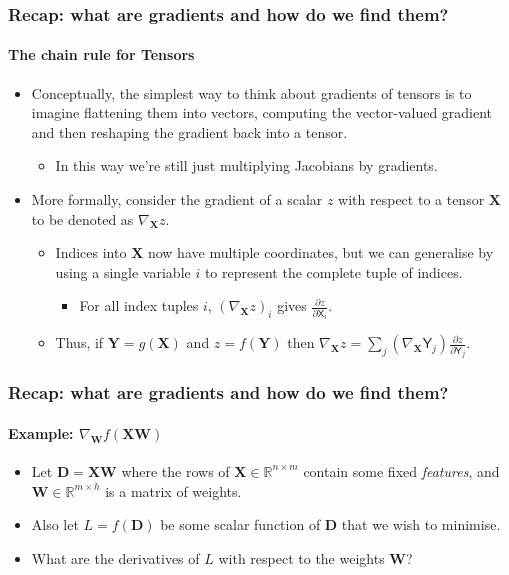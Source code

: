 \documentclass[\beamerclass]{beamer}
\begin{document}
\begin{frame}
\frametitle{Recap: what are gradients and how do we find them?}
\framesubtitle{The chain rule for Tensors}
\begin{itemize}
	\item<+-> Conceptually, the simplest way to think about gradients of tensors is to imagine flattening them into vectors, computing the vector-valued gradient and then reshaping the gradient back into a tensor. 
	\begin{itemize}
		\item<+-> In this way we're still just multiplying Jacobians by gradients. 
	\end{itemize}
	\item<+-> More formally, consider the gradient of a scalar $z$ with respect to a tensor $\mathbf{X}$ to be denoted as $\nabla_{\mathbf{X}}z$. 
	\begin{itemize}
		\item<+-> Indices into $\mathbf{X}$ now have multiple coordinates, but we can generalise by using a single variable $i$ to represent the complete tuple of indices. 
		\begin{itemize}
			\item<+-> For all index tuples $i$, $(\nabla_{\mathbf{X}}z)_i$ gives $\frac{\partial z}{\partial \mathsf{X}_i}$.
		\end{itemize}
		\item<+-> Thus, if $\mathbf{Y} = g(\mathbf{X})$ and $z = f(\mathbf{Y})$ then $\nabla_{\mathbf{X}}z = \sum_j (\nabla_{\mathbf{X}}\mathsf{Y}_j)\frac{\partial z}{\partial \mathsf{Y}_j}$.
	\end{itemize}
\end{itemize}


\end{frame}

\begin{frame}
\frametitle{Recap: what are gradients and how do we find them?}
\framesubtitle{Example: $\nabla_{\bm W} f(\bm X \bm W)$}
\begin{itemize}
\item<1-> Let $\bm D = \bm X \bm W$ where the rows of $\bm X \in \mathbb{R}^{n \times m}$ contain some fixed \emph{features}, and $\bm W \in \mathbb{R}^{m \times h}$ is a matrix of weights.
\item<1-> Also let $L = f(\bm D)$ be some scalar function of $\bm D$ that we wish to minimise. 
\item<2-> What are the derivatives of $L$ with respect to the weights $\bm W$?
\end{itemize}
\end{frame}
\end{document}
